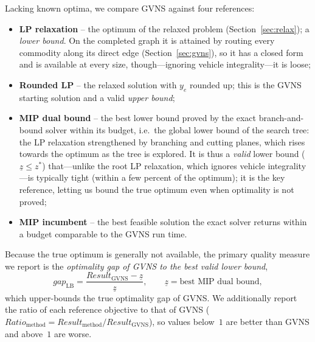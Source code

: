 \documentclass[runningheads]{llncs}
\begin{document}
Lacking known optima, we compare GVNS against four references:
\begin{itemize}[leftmargin=1.4em,itemsep=1pt,topsep=2pt]
\item \textbf{LP relaxation} -- the optimum of the relaxed problem
      (Section~\ref{sec:relax}); a \emph{lower bound}. On the completed graph it
      is attained by routing every commodity along its direct edge
      (Section~\ref{sec:gvns}), so it has a closed form and is available at every
      size, though---ignoring vehicle integrality---it is loose;
\item \textbf{Rounded LP} -- the relaxed solution with $y_e$ rounded up; this is
      the GVNS starting solution and a valid \emph{upper bound};
\item \textbf{MIP dual bound} -- the best lower bound proved by the exact
      branch-and-bound solver within its budget, i.e.\ the global lower bound of
      the search tree: the LP relaxation strengthened by branching and cutting
      planes, which rises towards the optimum as the tree is explored. It is thus
      a \emph{valid} lower bound ($\underline{z}\le z^{\ast}$) that---unlike the
      root LP relaxation, which ignores vehicle integrality---is typically tight
      (within a few percent of the optimum); it is the key reference, letting us
      bound the true optimum even when optimality is not proved;
\item \textbf{MIP incumbent} -- the best feasible solution the exact solver
      returns within a budget comparable to the GVNS run time.
\end{itemize}

Because the true optimum is generally not available, the primary quality
measure we report is the \emph{optimality gap of GVNS to the best valid lower
bound},
\[
  gap_{\mathrm{LB}}=\frac{Result_{\text{GVNS}}-\underline{z}}{\underline{z}},
  \qquad
  \underline{z}=\text{best MIP dual bound},
\]
which upper-bounds the true optimality gap of GVNS. We additionally report the
ratio of each reference objective to that of GVNS
($Ratio_{\text{method}}=Result_{\text{method}}/Result_{\text{GVNS}}$), so values
below~$1$ are better than GVNS and above~$1$ are worse.
\end{document}
